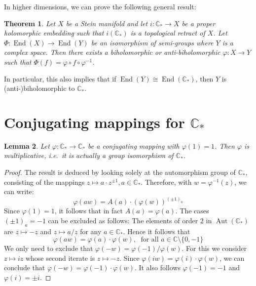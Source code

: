 \documentclass[a4paper,12pt]{amsart}
\newcommand{\CC}{\mathbb{C}}
\DeclareMathOperator{\aut}{Aut}
\DeclareMathOperator{\enmo}{End}
\newtheorem{theorem}{Theorem}[section]
\newtheorem{lemma}[theorem]{Lemma}
\theoremstyle{definition}
\begin{document}
In higher dimensions, we can prove the following general result:
\begin{theorem}\label{theorem-punctured-plane}
Let $X$ be a Stein manifold and let $i \colon \CC_\ast \to X$ be a proper holomorphic embedding such that $i(\CC_\ast)$ is a topological retract of $X$.
Let $\Phi \colon \enmo(X) \to \enmo(Y)$ be an isomorphism of semi-groups where $Y$ is a complex space. Then there exists a biholomorphic or anti-biholomorphic  $\varphi \colon X \to Y$ such that $\Phi(f) = \varphi \circ f \circ \varphi^{-1}$. 
\end{theorem}
In particular, this also implies that if $\enmo(Y) \cong \enmo(\CC_\ast)$, then $Y$ is (anti-)biholomorphic to $\CC_\ast$.

\section{Conjugating mappings for $\CC_\ast$}
\label{section-punctured-plane}

\begin{lemma}
Let $\varphi \colon \CC_\ast \to \CC_\ast$ be a conjugating mapping with $\varphi(1) = 1$. Then $\varphi$ is multiplicative, i.e.\ it is actually a group isomorphism of $\CC_\ast$.
\end{lemma}
\begin{proof}
The result is deduced by looking solely at the automorphism group of $\CC_*$, consisting of the mappings $z \mapsto a \cdot z^{\pm 1}, a \in \CC_\ast$. Therefore, with $w = \varphi^{-1}(z)$, we can write:
\begin{equation*}
\varphi(a w) = A(a) \cdot \left(\varphi(w)\right)^{(\pm 1)_a}
\end{equation*}
Since $\varphi(1) = 1$, it follows that in fact $A(a) = \varphi(a)$. The cases $(\pm 1)_a = -1$ can be excluded as follows:
The elements of order $2$ in $\aut(\CC_\ast)$ are $z \mapsto -z$ and $z \mapsto a/z$ for any $a \in \CC_\ast$. Hence it follows that 
\[
\varphi(a w) = \varphi(a) \cdot \varphi(w), \; \text{ for all } a \in \CC \setminus \{0, -1\}
\]
We only need to exclude that $\varphi(-w) = \varphi(-1)/\varphi(w)$.
For this we consider $z \mapsto i z$ whose second iterate is $z \mapsto -z$.
Since $\varphi(i w) = \varphi(i) \cdot \varphi(w)$, we can conclude that 
$\varphi(-w) = \varphi(-1) \cdot \varphi(w)$. It also follows $\varphi(-1) = -1$ and $\varphi(i) = \pm i$.
\end{proof}
\end{document}

